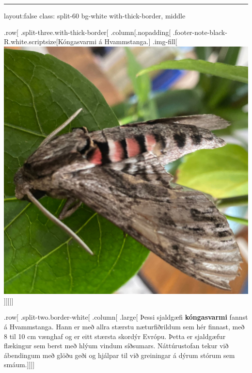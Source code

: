 \documentclass[
]{article}
\begin{document}
\begin{center}\rule{0.5\linewidth}{0.5pt}\end{center}

layout:false class: split-60 bg-white with-thick-border, middle

.row{[} .split-three.with-thick-border{[} .column{[}.nopadding{[}
.footer-note-black-R.white.scriptsize{[}Kóngasvarmi á Hvammstanga.{]}
.img-fill{[}\includegraphics{myndir/kongasvarmi.jpeg}{]}{]}{]}{]}{]}

.row{[} .split-two.border-white{[} .column{[} .large{[} Þessi sjaldgæfi
\textbf{kóngasvarmi} fannst á Hvammstanga. Hann er með allra stærstu
næturfiðrildum sem hér finnast, með 8 til 10 cm vænghaf og er eitt
stærsta skordýr Evrópu. Þetta er sjaldgæfur flækingur sem berst með
hlýum vindum síðsumars. Náttúrustofan tekur við ábendingum með glöðu
geði og hjálpar til við greiningar á dýrum stórum sem smáum.{]}{]}{]}{]}
\end{document}
